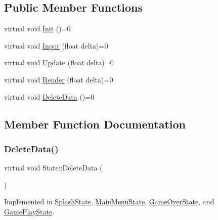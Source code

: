 \subsection*{Public Member Functions}
\begin{DoxyCompactItemize}
\item 
virtual void \hyperlink{classState_a7ab4d8c6aa239a17ed579d89a209b156}{Init} ()=0
\item 
virtual void \hyperlink{classState_a1705412877f37a5cc8fc712542756076}{Input} (float delta)=0
\item 
virtual void \hyperlink{classState_aac0d3fdee1341e168af730b8f31a7bf1}{Update} (float delta)=0
\item 
virtual void \hyperlink{classState_a0e48dfae1e3090630475812681417c5f}{Render} (float delta)=0
\item 
virtual void \hyperlink{classState_ade502eaa386d570e526eb356ffd73fd8}{Delete\+Data} ()=0
\end{DoxyCompactItemize}


\subsection{Member Function Documentation}
\mbox{\label{classState_ade502eaa386d570e526eb356ffd73fd8}} 
\subsubsection{\texorpdfstring{Delete\+Data()}{DeleteData()}}
{\footnotesize\ttfamily virtual void State\+::\+Delete\+Data (\begin{DoxyParamCaption}{ }\end{DoxyParamCaption})\hspace{0.3cm}{\ttfamily [pure virtual]}}



Implemented in \hyperlink{classSplashState_aca842c8e3ea2642980569ed3b4bb362a}{Splash\+State}, \hyperlink{classMainMenuState_a52c4dad229a1e9851e8742b81bc30abb}{Main\+Menu\+State}, \hyperlink{classGameOverState_afb6fa68ff0c5e4f83725de8059c4f7c8}{Game\+Over\+State}, and \hyperlink{classGamePlayState_a8a393249f2deabe0fe8f236b4e58cb17}{Game\+Play\+State}.

\mbox{\label{classState_a7ab4d8c6aa239a17ed579d89a209b156}} 
